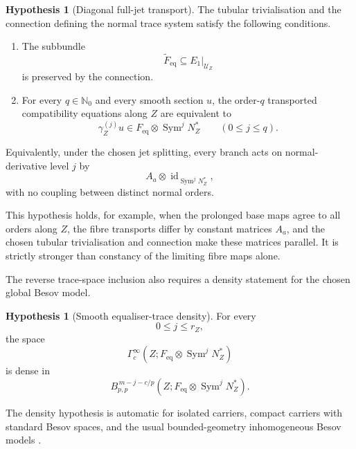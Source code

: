 \documentclass[11pt]{article}
\theoremstyle{plain}
\theoremstyle{definition}
\newtheorem{hypothesis}[theorem]{Hypothesis}
\begin{document}
\begin{hypothesis}[Diagonal full-jet transport]
\label{hyp:diagonal-full-jet-transport}
The tubular trivialisation and the connection defining the normal
trace system satisfy the following conditions.

\begin{enumerate}[label=\textup{(\roman*)}]
  \item The subbundle
        \[
          \widetilde F_{\mathrm{eq}}
          \subseteq
          E_1|_{\mathcal U_Z}
        \]
        is preserved by the connection.

  \item For every \(q\in\mathbb N_0\) and every smooth section \(u\),
        the order-\(q\) transported compatibility equations along
        \(Z\) are equivalent to
        \[
          \gamma_Z^{(j)}u
          \in
          F_{\mathrm{eq}}
          \otimes
          \operatorname{Sym}^jN_Z^*
          \qquad
          (0\leq j\leq q).
        \]
\end{enumerate}

Equivalently, under the chosen jet splitting, every branch acts on
normal-derivative level \(j\) by
\[
  A_a\otimes\operatorname{id}_{\operatorname{Sym}^jN_Z^*},
\]
with no coupling between distinct normal orders.
\end{hypothesis}

This hypothesis holds, for example, when the prolonged base maps agree
to all orders along \(Z\), the fibre transports differ by constant
matrices \(A_a\), and the chosen tubular trivialisation and connection
make these matrices parallel. It is strictly stronger than constancy
of the limiting fibre maps alone.

The reverse trace-space inclusion also requires a density statement
for the chosen global Besov model.

\begin{hypothesis}[Smooth equaliser-trace density]
\label{hyp:smooth-equaliser-trace-density}
For every
\[
  0\leq j\leq r_Z,
\]
the space
\[
  \Gamma_c^\infty
  \left(
    Z;
    F_{\mathrm{eq}}
    \otimes
    \operatorname{Sym}^jN_Z^*
  \right)
\]
is dense in
\[
  B_{p,p}^{\,m-j-c/p}
  \left(
    Z;
    F_{\mathrm{eq}}
    \otimes
    \operatorname{Sym}^jN_Z^*
  \right).
\]
\end{hypothesis}

The density hypothesis is automatic for isolated carriers, compact carriers with standard Besov spaces, and the usual bounded-geometry inhomogeneous Besov models \citep{Triebel1992,GrosseSchneider2013}.
\end{document}
